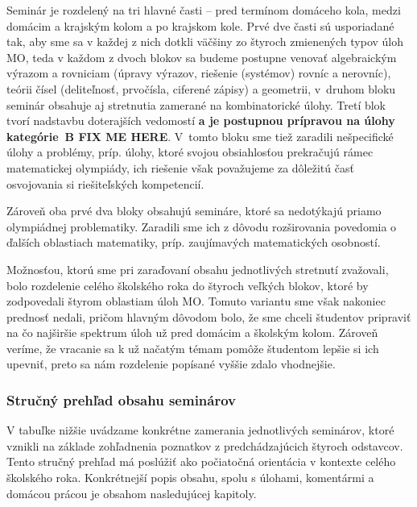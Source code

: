 \documentclass[11pt,a4paper,oneside,final]{book}
\begin{document}
Seminár je rozdelený na tri hlavné časti -- pred termínom domáceho kola, medzi domácim a krajským kolom a po krajskom kole. Prvé dve časti sú usporiadané tak, aby sme sa v každej z nich dotkli väčšiny zo štyroch zmienených typov úloh MO, teda v každom z dvoch blokov sa budeme postupne venovať algebraickým výrazom a rovniciam (úpravy výrazov, riešenie (systémov) rovníc a nerovníc), teórii čísel (deliteľnosť, prvočísla, ciferené zápisy) a geometrii, v~druhom bloku seminár obsahuje aj stretnutia zamerané na kombinatorické úlohy. Tretí blok tvorí nadstavbu doterajších vedomostí \textbf{a je postupnou prípravou na úlohy kategórie~B FIX ME HERE}. V~tomto bloku sme tiež zaradili nešpecifické úlohy a problémy, príp. úlohy, ktoré svojou obsiah\-losťou prekračujú rámec matematickej olympiády, ich riešenie však považujeme za dôležitú časť osvojovania si riešiteľských kompetencií.

Zároveň oba prvé dva bloky obsahujú semináre, ktoré sa nedotýkajú priamo olympiádnej problematiky. Zaradili sme ich z dôvodu rozširovania povedomia o ďalších oblastiach matematiky, príp. zaujímavých matematických osobností.

Možnosťou, ktorú sme pri zaraďovaní obsahu jednotlivých stretnutí zvažovali, bolo rozdelenie celého školského roka do štyroch veľkých blokov, ktoré by zodpovedali  štyrom oblastiam úloh MO. Tomuto variantu sme však nakoniec prednosť nedali, pričom hlavným dôvodom bolo, že sme chceli študentov pripraviť na čo najširšie spektrum úloh už pred domácim a školským kolom. Zároveň veríme, že vracanie sa k už načatým témam pomôže študentom lepšie si ich upevniť, preto sa nám rozdelenie popísané vyššie zdalo vhodnejšie.

\subsubsection*{Stručný prehľad obsahu seminárov}

V tabuľke nižšie uvádzame konkrétne zamerania jednotlivých seminárov, ktoré vznikli na základe zohľadnenia poznatkov z predchádzajúcich štyroch odstavcov. Tento stručný prehľad má poslúžiť ako počiatočná orientácia v kontexte celého školského roka. Konkrétnejší popis obsahu, spolu s úlohami, komentármi a domácou prácou je obsahom nasledujúcej kapitoly.
\end{document}
